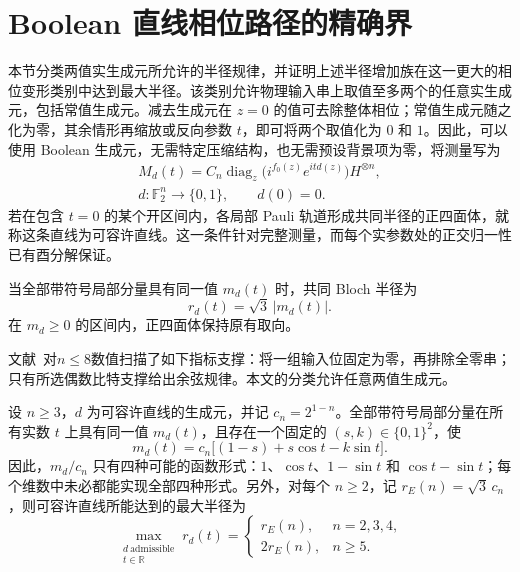 \section{Boolean 直线相位路径的精确界}
\label{bound:section}

本节分类两值实生成元所允许的半径规律，并证明上述半径增加族在这一更大的相位变形类别中达到最大半径。该类别允许物理输入串上取值至多两个的任意实生成元，包括常值生成元。减去生成元在 $z=0$ 的值可去除整体相位；常值生成元随之化为零，其余情形再缩放或反向参数 $t$，即可将两个取值化为 $0$ 和 $1$。因此，可以使用 Boolean 生成元，无需特定压缩结构，也无需预设背景项为零，将测量写为
\begin{equation}
 \begin{gathered}
 M_d(t)=C_n\operatorname{diag}_{z}
 \bigl(i^{f_0(z)}e^{itd(z)}\bigr)H^{\otimes n},\\
 d:\mathbb F_2^n\longrightarrow\{0,1\},\qquad d(0)=0.
 \end{gathered}
 \label{bound:line}
\end{equation}
若在包含 $t=0$ 的某个开区间内，各局部 Pauli 轨道形成共同半径的正四面体，就称这条直线为可容许直线。这一条件针对完整测量，而每个实参数处的正交归一性已有酉分解保证。

当全部带符号局部分量具有同一值 $m_d(t)$ 时，共同 Bloch 半径为
\begin{equation}
 r_d(t)=\sqrt3\,|m_d(t)|.
 \label{bound:radius}
\end{equation}
在 $m_d\ge0$ 的区间内，正四面体保持原有取向。

文献~\cite{PauwelsGisin2026}对$n\le8$数值扫描了如下指标支撑：将一组输入位固定为零，再排除全零串；只有所选偶数比特支撑给出余弦规律。本文的分类允许任意两值生成元。

\begin{theorem}
\label{bound:theorem}
设 $n\ge3$，$d$ 为可容许直线的生成元，并记 $c_n=2^{1-n}$。全部带符号局部分量在所有实数 $t$ 上具有同一值 $m_d(t)$，且存在一个固定的 $(s,k)\in\{0,1\}^2$，使
\begin{equation}
 m_d(t)=c_n\bigl[(1-s)+s\cos t-k\sin t\bigr].
 \label{bound:four-laws}
\end{equation}
因此，$m_d/c_n$ 只有四种可能的函数形式：$1$、$\cos t$、$1-\sin t$ 和 $\cos t-\sin t$；每个维数中未必都能实现全部四种形式。另外，对每个 $n\ge2$，记 $r_E(n)=\sqrt3\,c_n$，则可容许直线所能达到的最大半径为
\begin{equation}
 \max_{\substack{d\ \text{admissible}\\t\in\mathbb R}}r_d(t)
 =\begin{cases}
 r_E(n),&n=2,3,4,\\
 2r_E(n),&n\ge5.
 \end{cases}
 \label{bound:sharp-max}
\end{equation}
\end{theorem}

